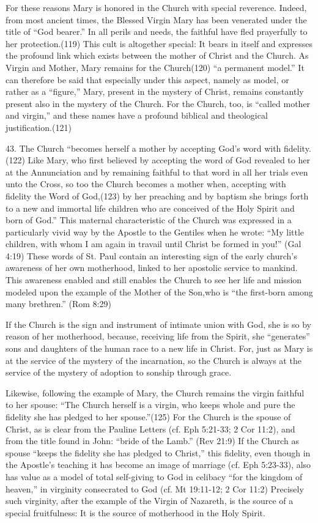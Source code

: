 \documentclass[oneside]{book}
\begin{document}
For these reasons Mary is honored in the Church with special reverence. Indeed,
from most ancient times, the Blessed Virgin Mary has been venerated under the
title of ``God bearer.'' In all perils and needs, the faithful have fled
prayerfully to her protection.(119) This cult is altogether special: It bears in
itself and expresses the profound link which exists between the mother of Christ
and the Church. As Virgin and Mother, Mary remains for the Church(120) ``a
permanent model.'' It can therefore be said that especially under this aspect,
namely as model, or rather as a ``figure,'' Mary, present in the mystery of
Christ, remains constantly present also in the mystery of the Church. For the
Church, too, is ``called mother and virgin,'' and these names have a profound
biblical and theological justification.(121)

43. The Church ``becomes herself a mother by accepting God's word with
fidelity. (122) Like Mary, who first believed by accepting the word of God
revealed to her at the Annunciation and by remaining faithful to that word in
all her trials even unto the Cross, so too the Church becomes a mother when,
accepting with fidelity the Word of God,(123) by her preaching and by baptism
she brings forth to a new and immortal life children who are conceived of the
Holy Spirit and born of God.'' This maternal characteristic of the Church was
expressed in a particularly vivid way by the Apostle to the Gentiles when he
wrote: ``My little children, with whom I am again in travail until Christ be
formed in you!'' (Gal 4:19) These words of St. Paul contain an interesting sign
of the early church's awareness of her own motherhood, linked to her apostolic
service to mankind. This awareness enabled and still enables the Church to see
her life and mission modeled upon the example of the Mother of the Son,who is
``the first-born among many brethren.'' (Rom 8:29)

If the Church is the sign and instrument of intimate union with God, she is so
by reason of her motherhood, because, receiving life from the Spirit, she
``generates'' sons and daughters of the human race to a new life in Christ. For,
just as Mary is at the service of the mystery of the incarnation, so the Church
is always at the service of the mystery of adoption to sonship through grace.

Likewise, following the example of Mary, the Church remains the virgin faithful
to her spouse: ``The Church herself is a virgin, who keeps whole and pure the
fidelity she has pledged to her spouse.''(125) For the Church is the spouse of
Christ, as is clear from the Pauline Letters 
(cf. Eph 5:21-33; 2 Cor 11:2), and from the title found in John: ``bride of the
Lamb.'' (Rev 21:9) If the Church as spouse ``keeps the fidelity she has pledged
to Christ,'' this fidelity, even though in the Apostle's teaching it has become
an image of marriage (cf. Eph 5:23-33), also has value as a model of total
self-giving to God in celibacy ``for the kingdom of heaven,'' in virginity
consecrated to God (cf. Mt 19:11-12; 2 Cor 11:2) Precisely such virginity, after
the example of the Virgin of Nazareth, is the source of a special fruitfulness:
It is the source of motherhood in the Holy Spirit.
\end{document}
